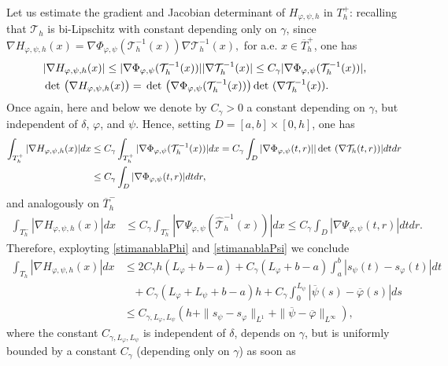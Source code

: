 \documentclass[a4paper,11pt]{article}
\numberwithin{equation}{section}
\def\det{\,{\rm det\ }}
\begin{document}
Let us estimate the gradient and Jacobian determinant of $H_{\varphi,\psi,h}$ in $ T_h^+$: recalling that $\mathcal T_h$ is bi-Lipschitz with constant depending only on $\gamma$, since $\nabla H_{\varphi,\psi,h}(x)=\nabla \Phi_{\varphi,\psi}(\mathcal T_h^{-1}(x))\nabla \mathcal T_h^{-1}(x),$  for a.e. $x\in \overline T_h^+$, one has 
\begin{align*}
&|\nabla H_{\varphi,\psi,h}(x)|\leq |\nabla \Phi_{\varphi,\psi}(\mathcal T_h^{-1}(x))||\nabla \mathcal T_h^{-1}(x)|\leq C_\gamma|\nabla \Phi_{\varphi,\psi}(\mathcal T_h^{-1}(x))|,\\
&\det\big(\nabla H_{\varphi,\psi,h}(x)\big)=\det\big(\nabla \Phi_{\varphi,\psi}(\mathcal T_h^{-1}(x))\big)\det(\nabla \mathcal T_h^{-1}(x)).
\end{align*}
Once again, here and below we denote by $C_\gamma>0$ a constant depending on $\gamma$, but independent of $\delta$, $\varphi$, and $\psi$.
Hence, setting $D=[a,b]\times [0,h]$, one has
\begin{align}
	\int_{T_h^+}|\nabla H_{\varphi,\psi,h}(x)|dx&\leq C_\gamma\int_{T_h^+}|\nabla \Phi_{\varphi,\psi}(\mathcal T_h^{-1}(x))|dx=C_\gamma\int_{D}|\nabla \Phi_{\varphi,\psi}(t,r)||\det(\nabla \mathcal T_h(t,r))|dtdr\nonumber\\
	&\leq C_\gamma\int_{D}|\nabla \Phi_{\varphi,\psi}(t,r)|dtdr,
\end{align}
and analogously on $\overline T_h^-$ 
\begin{align}
	\int_{T_h^-}|\nabla H_{\varphi,\psi,h}(x)|dx&\leq C_\gamma\int_{T_h^-}|\nabla \Psi_{\varphi,\psi}(\widehat {\mathcal T}_h^{-1}(x))|dx\leq C_\gamma\int_{D}|\nabla \Psi_{\varphi,\psi}(t,r)|dtdr.
\end{align}
Therefore, exployting \eqref{stimanablaPhi} and \eqref{stimanablaPsi} we conclude 
\begin{align}\label{est:nablaH}
	\int_{T_h}|\nabla H_{\varphi,\psi,h}(x)|dx&\leq 2C_\gamma h(L_\varphi+b-a)+C_\gamma (L_\varphi+b-a)\int_a^b|s_\psi(t)-s_\varphi(t)|dt\nonumber\\&\;\;\;+C_\gamma(L_\varphi+L_\psi+b-a)h+C_\gamma\int_0^{L_\psi}|{\overline \psi}(s)-{\overline \varphi}(s)|ds\nonumber\\
	&\leq C_{\gamma,L_\varphi,L_\psi}(h+\|s_\psi-s_\varphi\|_{L^1}+\|{\overline \psi}-{\overline \varphi}\|_{L^\infty}),
\end{align}
where the constant $C_{\gamma,L_\varphi,L_\psi}$ is independent of $\delta$, depends on $\gamma$, but is uniformly bounded by a constant $C_\gamma$ (depending only on $\gamma$) as soon as 
\end{document}
